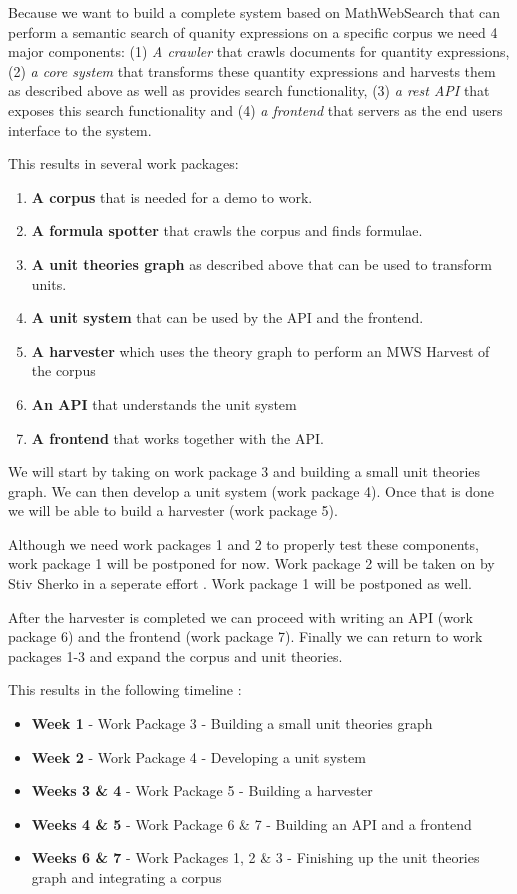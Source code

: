 \documentclass[11pt]{article}
\begin{document}
Because we want to build a complete system based on MathWebSearch that can perform a semantic search of quanity expressions on a specific corpus we need 4 major components: (1) \textit{A crawler} that crawls documents for quantity expressions, (2) \textit{a core system} that transforms these quantity expressions and harvests them as described above as well as provides search functionality, (3) \textit{a rest API} that exposes this search functionality and (4) \textit{a frontend} that servers as the end users interface to the system.

This results in several work packages:

\begin{enumerate}
  \item \textbf{A corpus} that is needed for a demo to work.
  \item \textbf{A formula spotter} that crawls the corpus and finds formulae.
  \item \textbf{A unit theories graph} as described above that can be used to transform units.
  \item \textbf{A unit system} that can be used by the API and the frontend.
  \item \textbf{A harvester} which uses the theory graph to perform an MWS Harvest of the corpus
  \item \textbf{An API} that understands the unit system
  \item \textbf{A frontend} that works together with the API.
\end{enumerate}

We will start by taking on work package 3 and building a small unit theories graph. We can then develop a unit system (work package 4). Once that is done we will be able to build a harvester (work package 5).

Although we need work packages 1 and 2 to properly test these components, work package 1 will be postponed for now. Work package 2 will be taken on by Stiv Sherko in a seperate effort \cite{proposal:sharko}. Work package 1 will be postponed as well.

After the harvester is completed we can proceed with writing an API (work package 6) and the frontend (work package 7). Finally we can return to work packages 1-3 and expand the corpus and unit theories.

This results in the following timeline :
\begin{itemize}
  \item \textbf{Week 1} - Work Package 3 - Building a small unit theories graph
  \item \textbf{Week 2} - Work Package 4 - Developing a unit system
  \item \textbf{Weeks 3 \& 4} - Work Package 5 - Building a harvester
  \item \textbf{Weeks 4 \& 5} - Work Package 6 \& 7 - Building an API and a frontend
  \item \textbf{Weeks 6 \& 7} - Work Packages 1, 2 \& 3 - Finishing up the unit theories graph and integrating a corpus
\end{itemize}

{}
\end{document}
